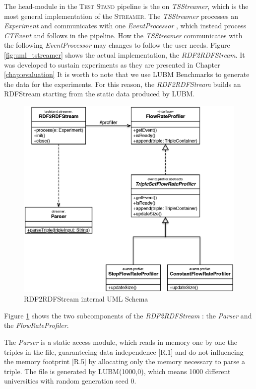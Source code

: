 The head-module in the \textsc{Test Stand} pipeline is the on \textit{TSStreamer}, which is the most general implementation of the \textsc{Streamer}. The \textit{TSStreamer} processes an \textit{Experiment} and communicates with one \textit{EventProcessor} , which instead process \textit{CTEvent} and follows in the pipeline. How the \textit{TSStreamer} communicates with the following \textit{EventProcessor} may changes to follow the user needs. Figure \ref{fig:uml_tstreamer} shows the actual implementation, the \textit{RDF2RDFStream}. It was developed to sustain experiments as they are presented in Chapter \ref{chap:evaluation}
It is worth to note that we use LUBM Benchmarks to generate the data for the experiments. For this reason, the \textit{RDF2RDFStream} builds an RDFStream starting from the static data produced by LUBM.

\begin{figure}[tbh]
  \centering
	\includegraphics[width=0.75\linewidth]{images/uml_flowrateprofiler}
	\caption{RDF2RDFStream internal UML Schema} 
  	\label{fig:uml_flowrateprofiler}
\end{figure}


Figure \ref{fig:uml_flowrateprofiler} shows the two subcomponents of the \textit{RDF2RDFStream} : the \textit{Parser} and the \textit{FlowRateProfiler}. 

The \textit{Parser} is a static access module, which reads in memory one by one the triples in the file, guaranteeing data independence [R.1] and do not influencing the memory footprint [R.5] by allocating only the memory necessary to parse a triple. The file is generated by LUBM(1000,0), which means 1000 different universities with random generation seed 0. 

